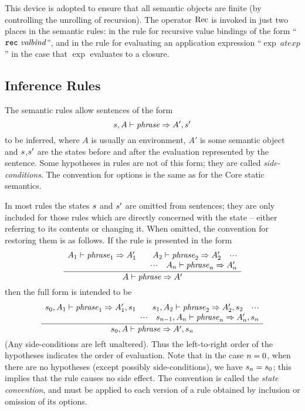 This device is adopted to ensure that all semantic objects are finite (by
controlling the unrolling of recursion).  The operator $\mathop{\rm Rec}\nolimits$ is invoked in
just two places in the semantic rules: in the rule for recursive value
bindings of the form ``${\tt rec}\ {\it valbind}$'', and in the rule for evaluating
an application expression ``$\exp\ atexp$'' in the case that $\exp$
evaluates to a  closure.

\subsection{Inference Rules}
\label{dyncor-inf-rules-sec}
The semantic rules allow sentences  of the form
\[ s,A\vdash{\it phrase}\Rightarrow A',s' \]
to be inferred, where $A$ is usually an environment, $A'$ is some semantic
object and $s$,$s'$ are the states before and after the evaluation
represented by the sentence.  Some hypotheses in rules are not of this form;
they are called {\sl side-conditions}.  The convention for options is
the same as for the Core static semantics.  

In most rules the states $s$ and $s'$ are omitted from sentences; they
are only included for those rules which are directly concerned with the state
-- either referring to its contents or changing it.  When omitted, the
convention for restoring them is as follows.  If the rule is presented in the
form
\[ \frac{ \begin{array}{r}
          A_1\vdash{\it phrase}_1\Rightarrow A_1'\qquad
          A_2\vdash{\it phrase}_2\Rightarrow A_2'\quad\mbox{$\cdot\!\cdot\!\cdot$}\\
          \mbox{$\cdot\!\cdot\!\cdot$}\quad A_n\vdash{\it phrase}_n\Rightarrow A_n'
          \end{array}
        }
        { A\vdash{\it phrase}\Rightarrow A'} \]
\oldpagebreak
then the full form is intended to be
\[ \frac{ \begin{array}{r}
          s_0,A_1\vdash{\it phrase}_1\Rightarrow A_1',s_1\qquad
          s_1,A_2\vdash{\it phrase}_2\Rightarrow A_2',s_2\quad\mbox{$\cdot\!\cdot\!\cdot$}\\
          \mbox{$\cdot\!\cdot\!\cdot$}\quad s_{n-1},A_n\vdash{\it phrase}_n\Rightarrow A_n',s_n
          \end{array}
        }
        { s_0,A\vdash{\it phrase}\Rightarrow A',s_n} \]
(Any side-conditions are left unaltered).
Thus the left-to-right order of the hypotheses indicates the order of
evaluation.  Note that in the case $n=0$, when there are no hypotheses
(except possibly side-conditions), we have $s_n=s_0$; this implies that the
rule causes no side effect.
The convention is called the {\sl state convention}, and
must be applied to each version of a rule obtained by inclusion or
omission of its options.

